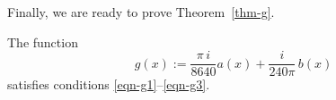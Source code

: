 Finally, we are ready to prove Theorem~\ref{thm-g}.
\begin{theorem}\label{thm-g1}
The function
$$g(x):=\frac{\pi\,i}{8640}a(x)+\frac{i}{240\pi}\,b(x)$$
satisfies conditions \eqref{eqn-g1}--\eqref{eqn-g3}.
\end{theorem}
